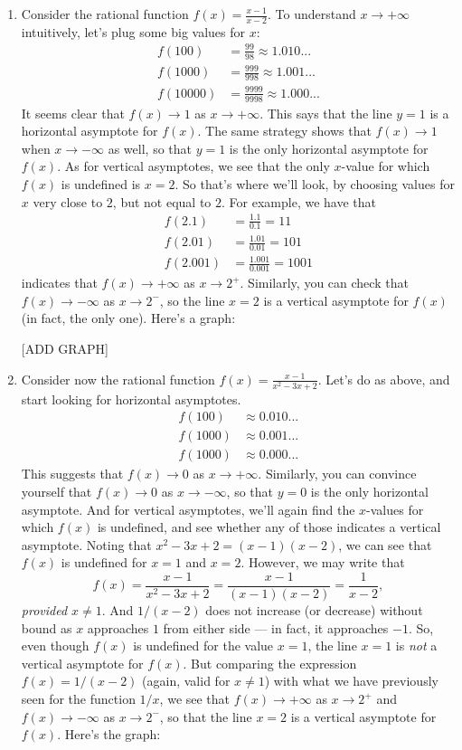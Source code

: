 \documentclass{ximera}
\begin{document}
\begin{example}
  \mbox{}
  \begin{enumerate}
  \item Consider the rational function $f(x) = \frac{x-1}{x-2}$. To understand $x\to +\infty$ intuitively, let's plug some big values for $x$:
    \begin{align*}
      f(100) &= \frac{99}{98} \approx 1.010... \\ f(1000) &= \frac{999}{998} \approx 1.001... \\ f(10000) &= \frac{9999}{9998} \approx 1.000...
    \end{align*}It seems clear that $f(x) \to 1$ as $x \to +\infty$. This says that the line $y=1$ is a horizontal asymptote for $f(x)$. The same strategy shows that $f(x) \to 1$ when $x \to -\infty$ as well, so that $y=1$ is the only horizontal asymptote for $f(x)$. As for vertical asymptotes, we see that the only $x$-value for which $f(x)$ is undefined is $x=2$. So that's where we'll look, by choosing values for $x$ very close to $2$, but not equal to $2$. For example, we have that
    \begin{align*}
      f(2.1) &= \frac{1.1}{0.1} = 11 \\ f(2.01) &= \frac{1.01}{0.01} = 101 \\ f(2.001) &= \frac{1.001}{0.001} = 1001 
    \end{align*}
    indicates that $f(x) \to +\infty$ as $x \to 2^+$. Similarly, you can check that $f(x) \to -\infty$ as $x \to 2^-$, so the line $x=2$ is a vertical asymptote for $f(x)$ (in fact, the only one). Here's a graph:

    [ADD GRAPH]
    
\item Consider now the rational function $f(x) = \frac{x-1}{x^2-3x+2}$. Let's do as above, and start looking for horizontal asymptotes.
  \begin{align*}
    f(100) &\approx 0.010... \\
    f(1000) &\approx 0.001... \\
    f(1000) &\approx 0.000...
  \end{align*}
  This suggests that $f(x) \to 0$ as $x \to +\infty$. Similarly, you can convince yourself that $f(x) \to 0$ as $x \to -\infty$, so that $y=0$ is the only horizontal asymptote. And for vertical asymptotes, we'll again find the $x$-values for which $f(x)$ is undefined, and see whether any of those indicates a vertical asymptote. Noting that $x^2-3x+2 = (x-1)(x-2)$, we can see that $f(x)$ is undefined for $x=1$ and $x=2$. However, we may write that \[   f(x) = \frac{x-1}{x^2-3x+2} = \frac{x-1}{(x-1)(x-2)} = \frac{1}{x-2},  \]\emph{provided $x \neq 1$}. And $1/(x-2)$ does not increase (or decrease) without bound as $x$ approaches $1$ from either side --- in fact, it approaches $-1$. So, even though $f(x)$ is undefined for the value $x=1$, the line $x=1$ is \emph{not} a vertical asymptote for $f(x)$. But comparing the expression $f(x) = 1/(x-2)$ (again, valid for $x \neq 1$) with what we have previously seen for the function $1/x$, we see that $f(x) \to +\infty$ as $x \to 2^+$ and $f(x) \to -\infty$ as $x \to 2^-$, so that the line $x=2$ is a vertical asymptote for $f(x)$. Here's the graph:


\end{enumerate}
\end{example}
\end{document}
